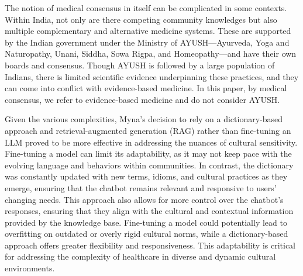 The notion of medical consensus in itself can be complicated in some contexts. Within India, not only are there competing community knowledges but also multiple complementary and alternative medicine systems. These are supported by the Indian government under the Ministry of AYUSH---Ayurveda, Yoga and Naturopathy, Unani, Siddha, Sowa Rigpa, and Homeopathy---and have their own boards and consensus. Though AYUSH is followed by a large population of Indians, there is limited scientific evidence underpinning these practices, and they can come into conflict with evidence-based medicine. In this paper, by medical consensus, we refer to evidence-based medicine and do not consider AYUSH.

Given the various complexities, Myna’s decision to rely on a dictionary-based approach and retrieval-augmented generation (RAG) rather than fine-tuning an LLM proved to be more effective in addressing the nuances of cultural sensitivity. Fine-tuning a model can limit its adaptability, as it may not keep pace with the evolving language and behaviors within communities. In contrast, the dictionary was constantly updated with new terms, idioms, and cultural practices as they emerge, ensuring that the chatbot remains relevant and responsive to users' changing needs.
This approach also allows for more control over the chatbot’s responses, ensuring that they align with the cultural and contextual information provided by the knowledge base. Fine-tuning a model could potentially lead to overfitting on outdated or overly rigid cultural norms, while a dictionary-based approach offers greater flexibility and responsiveness. This adaptability is critical for addressing the complexity of healthcare in diverse and dynamic cultural environments.

